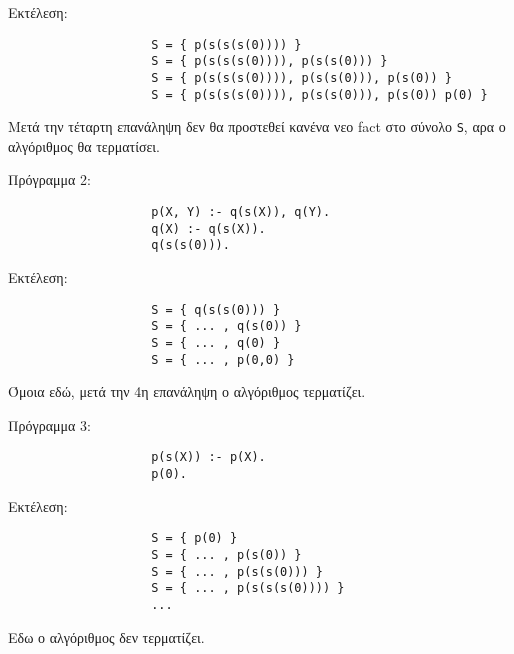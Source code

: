 \documentclass[10pt]{article}
\begin{document}
Εκτέλεση:
\begin{verbatim}
                    S = { p(s(s(s(0)))) }
                    S = { p(s(s(s(0)))), p(s(s(0))) }
                    S = { p(s(s(s(0)))), p(s(s(0))), p(s(0)) }
                    S = { p(s(s(s(0)))), p(s(s(0))), p(s(0)) p(0) }
\end{verbatim}

Μετά την τέταρτη επανάληψη δεν θα προστεθεί κανένα νεο fact στο σύνολο \verb|S|, αρα ο αλγόριθμος θα τερματίσει.





Πρόγραμμα 2:
\begin{verbatim}
                    p(X, Y) :- q(s(X)), q(Y).
                    q(X) :- q(s(X)).
                    q(s(s(0))).
\end{verbatim}

Εκτέλεση:
\begin{verbatim}
                    S = { q(s(s(0))) }
                    S = { ... , q(s(0)) }
                    S = { ... , q(0) }
                    S = { ... , p(0,0) }
\end{verbatim}

Όμοια εδώ, μετά την 4η επανάληψη ο αλγόριθμος τερματίζει.




Πρόγραμμα 3:
\begin{verbatim}
                    p(s(X)) :- p(X).
                    p(0).
\end{verbatim}

Εκτέλεση:
\begin{verbatim}
                    S = { p(0) }
                    S = { ... , p(s(0)) }
                    S = { ... , p(s(s(0))) }
                    S = { ... , p(s(s(s(0)))) }
                    ...
\end{verbatim}

Εδω ο αλγόριθμος δεν τερματίζει.

\end{document}
